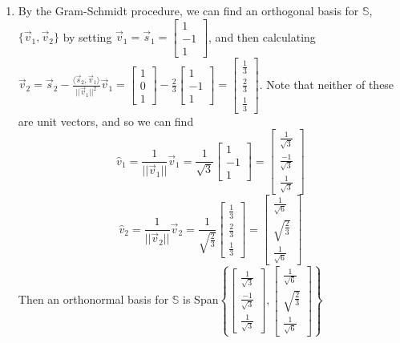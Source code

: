 \documentclass[10pt,english]{article}
\begin{document}
\begin{enumerate}
\begin{enumerate}
    \item By the Gram-Schmidt procedure, we can find an orthogonal basis for $\mathbb{S}$, $\{\vec{v}_1,\vec{v}_2\}$ by setting $\vec{v}_1=\vec{s}_1=\begin{bmatrix}1\\-1\\1\end{bmatrix}$, and then calculating $\vec{v}_2=\vec{s}_2-\frac{\langle\vec{s}_2,\vec{v}_1\rangle}{||\vec{v}_1||^2}\vec{v}_1=\begin{bmatrix}1\\0\\1\end{bmatrix}-\frac{2}{3}\begin{bmatrix}1\\-1\\1\end{bmatrix}=\begin{bmatrix}\frac{1}{3}\\\frac{2}{3}\\\frac{1}{3}\end{bmatrix}$. Note that neither of these are unit vectors, and so we can find $$\hat{v}_1=\frac{1}{||\vec{v}_1||}\vec{v}_1=\frac{1}{\sqrt{3}}\begin{bmatrix}1\\-1\\1\end{bmatrix}=\begin{bmatrix}\frac{1}{\sqrt{3}}\\\frac{-1}{\sqrt{3}}\\\frac{1}{\sqrt{3}}\end{bmatrix}$$ $$\hat{v}_2=\frac{1}{||\vec{v}_2||}\vec{v}_2=\frac{1}{\sqrt{\frac{2}{3}}}\begin{bmatrix}\frac{1}{3}\\\frac{2}{3}\\\frac{1}{3}\end{bmatrix}=\begin{bmatrix}\frac{1}{\sqrt{6}}\\\sqrt{\frac{2}{3}}\\\frac{1}{\sqrt{6}}\end{bmatrix}$$ Then an orthonormal basis for $\mathbb{S}$ is Span$\left\{\begin{bmatrix}\frac{1}{\sqrt{3}}\\\frac{-1}{\sqrt{3}}\\\frac{1}{\sqrt{3}}\end{bmatrix},\begin{bmatrix}\frac{1}{\sqrt{6}}\\\sqrt{\frac{2}{3}}\\\frac{1}{\sqrt{6}}\end{bmatrix}\right\}$

\end{enumerate}
\end{enumerate}
\end{document}
